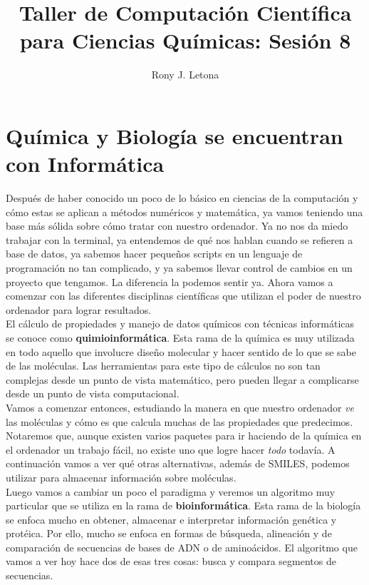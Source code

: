 \documentclass[10pt,letterpaper]{article}
\author{Rony J. Letona}
\title{Taller de Computaci\'on Cient\'ifica para Ciencias Qu\'imicas: Sesi\'on 8}
\begin{document}
\maketitle

\section{Qu\'imica y Biolog\'ia se encuentran con Inform\'atica}
Despu\'es de haber conocido un poco de lo b\'asico en ciencias de la computaci\'on y c\'omo estas se aplican a m\'etodos num\'ericos y matem\'atica, ya vamos teniendo una base m\'as s\'olida sobre c\'omo tratar con nuestro ordenador. Ya no nos da miedo trabajar con la terminal, ya entendemos de qu\'e nos hablan cuando se refieren a base de datos, ya sabemos hacer peque\~nos scripts en un lenguaje de programaci\'on no tan complicado, y ya sabemos llevar control de cambios en un proyecto que tengamos. La diferencia la podemos sentir ya. Ahora vamos a comenzar con las diferentes disciplinas cient\'ificas que utilizan el poder de nuestro ordenador para lograr resultados.\\

El c\'alculo de propiedades y manejo de datos qu\'imicos con t\'ecnicas inform\'aticas se conoce como \textbf{quimioinform\'atica}. Esta rama de la qu\'imica es muy utilizada en todo aquello que involucre dise\~no molecular y hacer sentido de lo que se sabe de las mol\'eculas. Las herramientas para este tipo de c\'alculos no son tan complejas desde un punto de vista matem\'atico, pero pueden llegar a complicarse desde un punto de vista computacional.\\

Vamos a comenzar entonces, estudiando la manera en que nuestro ordenador \emph{ve} las mol\'eculas y c\'omo es que calcula muchas de las propiedades que predecimos. Notaremos que, aunque existen varios paquetes para ir haciendo de la qu\'imica en el ordenador un trabajo f\'acil, no existe uno que logre hacer \emph{todo} todav\'ia. A continuaci\'on vamos a ver qu\'e otras alternativas, adem\'as de SMILES, podemos utilizar para almacenar informaci\'on sobre mol\'eculas.\\

Luego vamos a cambiar un poco el paradigma y veremos un algoritmo muy particular que se utiliza en la rama de \textbf{bioinform\'atica}. Esta rama de la biolog\'ia se enfoca mucho en obtener, almacenar e interpretar informaci\'on gen\'etica y prot\'eica. Por ello, mucho se enfoca en formas de b\'usqueda, alineaci\'on y de comparaci\'on de secuencias de bases de ADN o de amino\'acidos. El algoritmo que vamos a ver hoy hace dos de esas tres cosas: busca y compara segmentos de secuencias.\\
\end{document}
